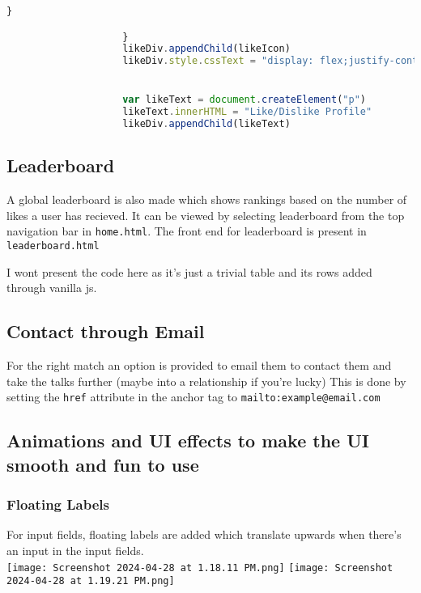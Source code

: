 \documentclass{article}
\begin{document}
\begin{lstlisting}[language=javascript]
                        }

                    }
                    likeDiv.appendChild(likeIcon)
                    likeDiv.style.cssText = "display: flex;justify-content: center;align-items: center;font-size: 1.2em;"


                    var likeText = document.createElement("p")
                    likeText.innerHTML = "Like/Dislike Profile"
                    likeDiv.appendChild(likeText)    


\end{lstlisting}

\subsection{Leaderboard}
A global leaderboard is also made which shows rankings based on the number of likes a user has recieved. It can be viewed by selecting leaderboard from the top navigation bar in \texttt{home.html}. The front end for leaderboard is present in \texttt{leaderboard.html}

I wont present the code here as it's just a trivial table and its rows added through vanilla js.

\subsection{Contact through Email}
For the right match an option is provided to email them to contact them and take the talks further (maybe into a relationship if you're lucky)
This is done by setting the \texttt{href} attribute in the anchor tag to \texttt{mailto:example@email.com}

\subsection{Animations and UI effects to make the UI smooth and fun to use}
\subsubsection{Floating Labels}
For input fields, floating labels are added which translate upwards when there's an input in the input fields. \\

\texttt{[image: Screenshot 2024-04-28 at 1.18.11 PM.png]}
\texttt{[image: Screenshot 2024-04-28 at 1.19.21 PM.png]}
\end{document}
